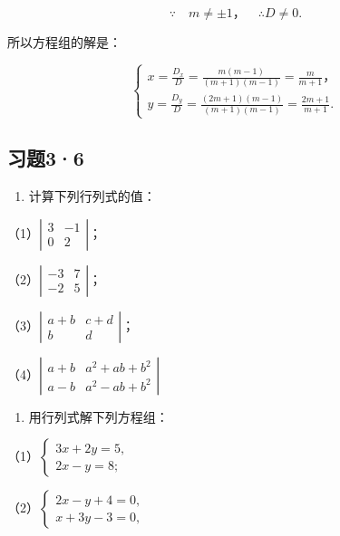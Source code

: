 \[
\because \quad m \neq \pm 1\text{，} \quad \therefore D \neq 0.
\]

所以方程组的解是：

\[
\left\{ \begin{array}{l} x = \frac{D _ {x}}{D} = \frac{m (m - 1)}{(m + 1) (m - 1)} = \frac{m}{m + 1}\text{，} \\ y = \frac{D _ {y}}{D} = \frac{(2 m + 1) (m - 1)}{(m + 1) (m - 1)} = \frac{2 m + 1}{m + 1}. \end{array} \right.
\]

\subsection{习题3·6}

\begin{enumerate}
\item
  计算下列行列式的值：
\end{enumerate}

（1）\(\left| \begin{array}{cc}3 & -1\\ 0 & 2 \end{array} \right|\)；

（2）\(\left| \begin{array}{cc} - 3 & 7\\ -2 & 5 \end{array} \right|\)；

（3）\(\left| \begin{array}{cc}a + b & c + d\\ b & d \end{array} \right|\)；

（4）\(\left| \begin{array}{ll}a + b & a^2 +ab + b^2\\ a - b & a^2 -ab + b^2 \end{array} \right|\)

\begin{enumerate}[start=2]
\item
  用行列式解下列方程组：
\end{enumerate}

（1）\(\left\{ \begin{array}{l} 3x + 2y = 5, \\ 2x - y = 8; \end{array} \right.\)

（2）\(\left\{ \begin{array}{l} 2x - y + 4 = 0, \\ x + 3y - 3 = 0, \end{array} \right.\)

